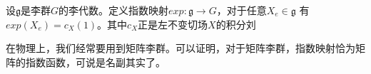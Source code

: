 
\begin{definition}{}
设$\mathfrak g$是李群$G$的李代数。定义指数映射$exp:\mathfrak g\to G$，对于任意$X_e\in \mathfrak g$ 有$exp(X_e)=c_X(1)$。其中$c_X$正是左不变切场$X$的积分刘
\end{definition}
在物理上，我们经常要用到矩阵李群。可以证明，对于矩阵李群，指数映射恰为矩阵的指数函数，可说是名副其实了。

